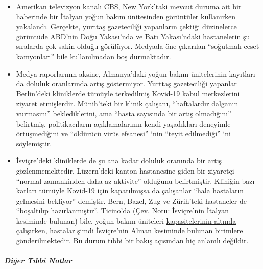 \begin{itemize}
\tightlist
\item
  Amerikan televizyon kanalı CBS, New York'taki mevcut duruma ait bir
  haberinde bir İtalyan yoğun bakım ünitesinden görüntüler kullanırken
  \href{https://www.theblaze.com/news/cbs-news-footage-italy-hospital-nyc}{yakalandı}.
  Gerçekte, \href{https://www.youtube.com/watch?v=K0z8NhxNTaU}{yurttaş
  gazeteciliği yapanların çektiği düzinelerce
  görüntü}\href{https://www.youtube.com/watch?v=K0z8NhxNTaU}{de} ABD'nin
  Doğu Yakası'nda ve Batı Yakası'ndaki hastanelerin şu sıralarda
  \href{https://twitter.com/mil_ops/status/1244286621475844097}{çok
  sakin} olduğu görülüyor. Medyada öne çıkarılan ``soğutmalı ceset
  kamyonları'' bile kullanılmadan boş durmaktadır. 
\item
  Medya raporlarının aksine, Almanya'daki yoğun bakım ünitelerinin
  kayıtları da
  \href{https://www.divi.de/register/intensivregister}{doluluk
  oranlarında artış göstermiyor}. Yurttaş gazeteciliği yapanlar
  Berlin'deki kliniklerde
  \href{https://www.youtube.com/watch?v=WiJszJmGdxY}{tümüyle terkedilmiş
  Kovid-19 kabul merkezlerini} ziyaret etmişlerdir. Münih'teki bir
  klinik çalışanı, ``haftalardır dalganın vurmasını'' beklediklerini,
  ama ``hasta sayısında bir artış olmadığını'' belirtmiş,
  politikacıların açıklamalarının kendi yaşadıkları deneyimle
  örtüşmediğini ve ``öldürücü virüs efsanesi'' `nin ``teyit edilmediği''
  `ni söylemiştir. 
\item
  İsviçre'deki kliniklerde de şu ana kadar doluluk oranında bir artış
  gözlenmemektedir. Lüzern'deki kanton hastanesine giden bir ziyaretçi
  ``normal zamankinden daha az aktivite'' olduğunu belirtmiştir.
  Kliniğin bazı katları tümüyle Kovid-19 için kapatılmışsa da çalışanlar
  ``hala hastaların gelmesini bekliyor'' demiştir. Bern, Bazel, Zug ve
  Zürih'teki hastaneler de ``boşaltılıp hazırlanmıştır''. Ticino'da
  (Çev. Notu: İsviçre'nin İtalyan kesiminde bulunan) bile, yoğun bakım
  üniteleri
  \href{https://www.nzz.ch/schweiz/tessin-verlegt-erste-corona-patienten-in-deutschschweizer-spitaeler-ld.1549417}{kapasitelerinin
  altında çalışırken}, hastalar şimdi İsviçre'nin Alman kesiminde
  bulunan birimlere gönderilmektedir. Bu durum tıbbi bir bakış açısından
  hiç anlamlı değildir.
\end{itemize}

\hypertarget{diux11fer-tux131bbi-notlar}{%
\subparagraph{\texorpdfstring{\textbf{Diğer Tıbbi
Notlar}}{Diğer Tıbbi Notlar}}\label{diux11fer-tux131bbi-notlar}}

